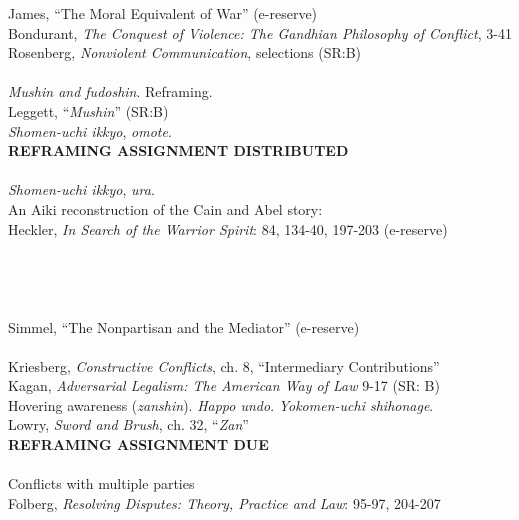 \indent James, ``The Moral Equivalent of War'' (e-reserve) \\
\indent Bondurant, \emph{The Conquest of Violence: The Gandhian Philosophy of Conflict}, 3-41 \\
\indent Rosenberg, \emph{Nonviolent Communication}, selections (SR:B) \\
 \\
\indent \emph{Mushin and fudoshin}. Reframing. \\
\indent Leggett, ``\emph{Mushin}'' (SR:B) \\
\indent \emph{Shomen-uchi ikkyo}, \emph{omote}. \\
\indent \textbf{\uppercase{Reframing assignment distributed}} \\
 \\
\indent \emph{Shomen-uchi ikkyo}, \emph{ura}.  \\
\indent An Aiki reconstruction of the Cain and Abel story: \\
\indent Heckler, \emph{In Search of the Warrior Spirit}: 84, 134-40, 197-203 (e-reserve) \\
\indent \indent  \\
 \\
 \\
 \\
\indent Simmel, ``The Nonpartisan and the Mediator'' (e-reserve) \\
 \\
\indent Kriesberg, \emph{Constructive Conflicts}, ch. 8, ``Intermediary Contributions'' \\
\indent Kagan, \emph{Adversarial Legalism: The American Way of Law} 9-17 (SR: B) \\
\indent Hovering awareness (\emph{zanshin}). \emph{Happo undo}. \emph{Yokomen-uchi shihonage}. \\
\indent Lowry, \emph{Sword and Brush}, ch. 32, ``\emph{Zan}'' \\
\indent \textbf{\uppercase{Reframing assignment due}} \\
 \\
\indent Conflicts with multiple parties \\
\indent Folberg, \emph{Resolving Disputes: Theory, Practice and Law}: 95-97, 204-207  \\
